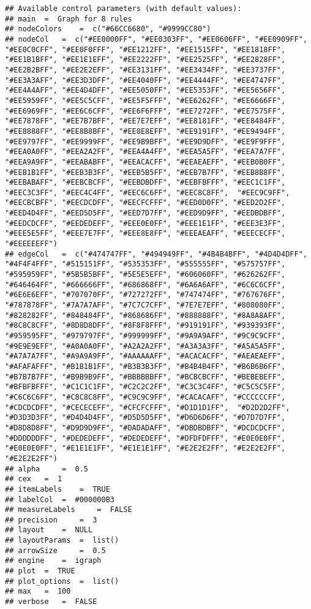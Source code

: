 \documentclass[]{article}
\begin{document}
\begin{verbatim}
## Available control parameters (with default values):
## main  =  Graph for 8 rules
## nodeColors    =  c("#66CC6680", "#9999CC80")
## nodeCol   =  c("#EE0000FF", "#EE0303FF", "#EE0606FF", "#EE0909FF", "#EE0C0CFF", "#EE0F0FFF", "#EE1212FF", "#EE1515FF", "#EE1818FF", "#EE1B1BFF", "#EE1E1EFF", "#EE2222FF", "#EE2525FF", "#EE2828FF", "#EE2B2BFF", "#EE2E2EFF", "#EE3131FF", "#EE3434FF", "#EE3737FF", "#EE3A3AFF", "#EE3D3DFF", "#EE4040FF", "#EE4444FF", "#EE4747FF", "#EE4A4AFF", "#EE4D4DFF", "#EE5050FF", "#EE5353FF", "#EE5656FF", "#EE5959FF", "#EE5C5CFF", "#EE5F5FFF", "#EE6262FF", "#EE6666FF", "#EE6969FF", "#EE6C6CFF", "#EE6F6FFF", "#EE7272FF", "#EE7575FF",  "#EE7878FF", "#EE7B7BFF", "#EE7E7EFF", "#EE8181FF", "#EE8484FF", "#EE8888FF", "#EE8B8BFF", "#EE8E8EFF", "#EE9191FF", "#EE9494FF", "#EE9797FF", "#EE9999FF", "#EE9B9BFF", "#EE9D9DFF", "#EE9F9FFF", "#EEA0A0FF", "#EEA2A2FF", "#EEA4A4FF", "#EEA5A5FF", "#EEA7A7FF", "#EEA9A9FF", "#EEABABFF", "#EEACACFF", "#EEAEAEFF", "#EEB0B0FF", "#EEB1B1FF", "#EEB3B3FF", "#EEB5B5FF", "#EEB7B7FF", "#EEB8B8FF", "#EEBABAFF", "#EEBCBCFF", "#EEBDBDFF", "#EEBFBFFF", "#EEC1C1FF", "#EEC3C3FF", "#EEC4C4FF", "#EEC6C6FF", "#EEC8C8FF",  "#EEC9C9FF", "#EECBCBFF", "#EECDCDFF", "#EECFCFFF", "#EED0D0FF", "#EED2D2FF", "#EED4D4FF", "#EED5D5FF", "#EED7D7FF", "#EED9D9FF", "#EEDBDBFF", "#EEDCDCFF", "#EEDEDEFF", "#EEE0E0FF", "#EEE1E1FF", "#EEE3E3FF", "#EEE5E5FF", "#EEE7E7FF", "#EEE8E8FF", "#EEEAEAFF", "#EEECECFF", "#EEEEEEFF")
## edgeCol   =  c("#474747FF", "#494949FF", "#4B4B4BFF", "#4D4D4DFF", "#4F4F4FFF", "#515151FF", "#535353FF", "#555555FF", "#575757FF", "#595959FF", "#5B5B5BFF", "#5E5E5EFF", "#606060FF", "#626262FF", "#646464FF", "#666666FF", "#686868FF", "#6A6A6AFF", "#6C6C6CFF", "#6E6E6EFF", "#707070FF", "#727272FF", "#747474FF", "#767676FF", "#787878FF", "#7A7A7AFF", "#7C7C7CFF", "#7E7E7EFF", "#808080FF", "#828282FF", "#848484FF", "#868686FF", "#888888FF", "#8A8A8AFF", "#8C8C8CFF", "#8D8D8DFF", "#8F8F8FFF", "#919191FF", "#939393FF",  "#959595FF", "#979797FF", "#999999FF", "#9A9A9AFF", "#9C9C9CFF", "#9E9E9EFF", "#A0A0A0FF", "#A2A2A2FF", "#A3A3A3FF", "#A5A5A5FF", "#A7A7A7FF", "#A9A9A9FF", "#AAAAAAFF", "#ACACACFF", "#AEAEAEFF", "#AFAFAFFF", "#B1B1B1FF", "#B3B3B3FF", "#B4B4B4FF", "#B6B6B6FF", "#B7B7B7FF", "#B9B9B9FF", "#BBBBBBFF", "#BCBCBCFF", "#BEBEBEFF", "#BFBFBFFF", "#C1C1C1FF", "#C2C2C2FF", "#C3C3C4FF", "#C5C5C5FF", "#C6C6C6FF", "#C8C8C8FF", "#C9C9C9FF", "#CACACAFF", "#CCCCCCFF", "#CDCDCDFF", "#CECECEFF", "#CFCFCFFF", "#D1D1D1FF",  "#D2D2D2FF", "#D3D3D3FF", "#D4D4D4FF", "#D5D5D5FF", "#D6D6D6FF", "#D7D7D7FF", "#D8D8D8FF", "#D9D9D9FF", "#DADADAFF", "#DBDBDBFF", "#DCDCDCFF", "#DDDDDDFF", "#DEDEDEFF", "#DEDEDEFF", "#DFDFDFFF", "#E0E0E0FF", "#E0E0E0FF", "#E1E1E1FF", "#E1E1E1FF", "#E2E2E2FF", "#E2E2E2FF", "#E2E2E2FF")
## alpha     =  0.5
## cex   =  1
## itemLabels    =  TRUE
## labelCol  =  #000000B3
## measureLabels     =  FALSE
## precision     =  3
## layout    =  NULL
## layoutParams  =  list()
## arrowSize     =  0.5
## engine    =  igraph
## plot  =  TRUE
## plot_options  =  list()
## max   =  100
## verbose   =  FALSE
\end{verbatim}
\end{document}
